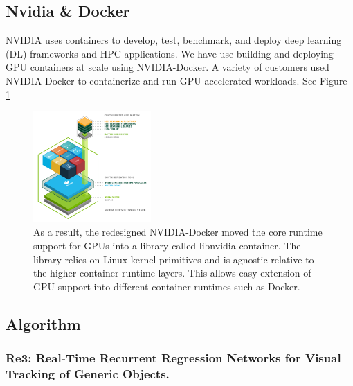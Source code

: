 \documentclass[a4paper]{article}
\begin{document}
\subsection{Nvidia \& Docker}
NVIDIA uses containers to develop, test, benchmark, and deploy deep learning (DL) frameworks and HPC applications. We have use building and deploying GPU containers at scale using NVIDIA-Docker.  A variety of customers used NVIDIA-Docker to containerize and run GPU accelerated workloads. See Figure \ref{fig:nvidia-docker}

\begin{figure}[hb]
    \centering
    \includegraphics[width=0.4\textwidth]{figures/nvidia-docker.png}
    \caption{As a result, the redesigned NVIDIA-Docker moved the core runtime support for GPUs into a  library called libnvidia-container. The library relies on Linux kernel primitives and is agnostic relative to the higher container runtime layers. This allows easy extension of GPU support into different container runtimes such as Docker.}
    \label{fig:nvidia-docker}
\end{figure}


\subsection{Algorithm}
\subsubsection{Re3: Real-Time Recurrent Regression Networks for Visual Tracking of Generic Objects.}
\end{document}
